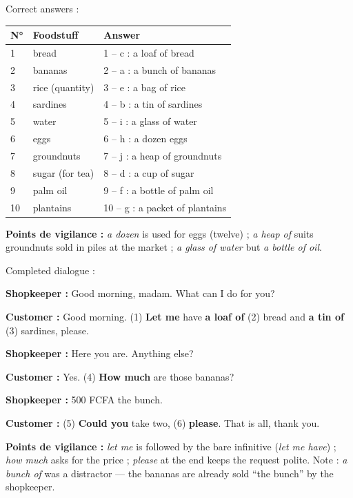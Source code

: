 \documentclass[11pt]{article}
\begin{document}
\begin{corrige}
Correct answers :
\begin{center}
\begin{tabularx}{\linewidth}{|l|X|l|}
\hline
\rowcolor{popblueL} \textbf{N°} & \textbf{Foodstuff} & \textbf{Answer} \\
\hline
1 & bread & 1 -- c : a loaf of bread \\
\hline
2 & bananas & 2 -- a : a bunch of bananas \\
\hline
3 & rice (quantity) & 3 -- e : a bag of rice \\
\hline
4 & sardines & 4 -- b : a tin of sardines \\
\hline
5 & water & 5 -- i : a glass of water \\
\hline
6 & eggs & 6 -- h : a dozen eggs \\
\hline
7 & groundnuts & 7 -- j : a heap of groundnuts \\
\hline
8 & sugar (for tea) & 8 -- d : a cup of sugar \\
\hline
9 & palm oil & 9 -- f : a bottle of palm oil \\
\hline
10 & plantains & 10 -- g : a packet of plantains \\
\hline
\end{tabularx}
\end{center}
\textbf{Points de vigilance :} \emph{a dozen} is used for eggs (twelve) ; \emph{a heap of} suits groundnuts sold in piles at the market ; \emph{a glass of water} but \emph{a bottle of oil}.
\end{corrige}

\begin{corrige}
Completed dialogue :

\textbf{Shopkeeper :} Good morning, madam. What can I do for you?

\textbf{Customer :} Good morning. (1) \textbf{Let me} have \textbf{a loaf of} (2) bread and \textbf{a tin of} (3) sardines, please.

\textbf{Shopkeeper :} Here you are. Anything else?

\textbf{Customer :} Yes. (4) \textbf{How much} are those bananas?

\textbf{Shopkeeper :} 500 FCFA the bunch.

\textbf{Customer :} (5) \textbf{Could you} take two, (6) \textbf{please}. That is all, thank you.

\textbf{Points de vigilance :} \emph{let me} is followed by the bare infinitive (\emph{let me have}) ; \emph{how much} asks for the price ; \emph{please} at the end keeps the request polite. Note : \emph{a bunch of} was a distractor — the bananas are already sold ``the bunch'' by the shopkeeper.
\end{corrige}
\end{document}
